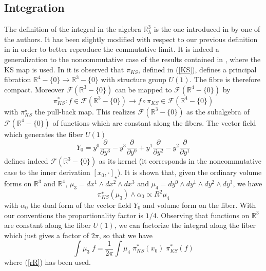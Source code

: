 \documentclass[a4paper,11pt]{article}
\numberwithin{equation}{section}
\newcommand{\be}{\begin{equation}}
\newcommand{\ee}{\end{equation}}
\newcommand{\eqn}[1]{(\ref{#1})}
\newcommand\gR{{\mathbb R}}
\def\gR{{\mathbb R}}
\newcommand\del{{\partial}}
\theoremstyle{nonumberplain}
\begin{document}
  \subsection{Integration}
 The definition of the integral in the algebra $\gR^3_\lambda$ is the one introduced in \cite{V14} by one of the authors. It has been slightly modified with respect to our previous definition in \cite{vit-wal-12}  in order to better reproduce the commutative limit.  It is indeed a  generalization to the noncommutative case of the results contained in  \cite{DMV05}, where the  KS map is used. 
In \cite{DMV05}  it is   observed  that $\pi_{KS}$, defined in \eqn{KS}, defines a principal fibration $\gR^4-\{0\}\rightarrow \gR^3-\{0\}$ with structure group $U(1)$. The fibre is therefore compact. Moreover $\mathcal{F}(\gR^3-\{0\})$ can be mapped to  $\mathcal{F}(\gR^4-\{0\})$ by
 \be
\pi^*_{KS}: f \in \mathcal{F}(\gR^3-\{0\})\rightarrow f\circ \pi_{KS}\in \mathcal{F}(\gR^4-\{0\})
\ee
with  $\pi_{KS}^\star$ the pull-back map.
This realizes $\mathcal{F}(\gR^3-\{0\})$ as the subalgebra of $\mathcal{F}(\gR^4-\{0\})$ of functions which are constant along the fibers.
The vector field which generates the fiber $U(1)$
\be
Y_0= y^0 \frac{\del}{ \del y^3} - y^3 \frac{\del}{ \del y^0 } +y^1 \frac{\del}{ \del y^2} -y^2 \frac{\del}{ \del y^1} \label{fibergen}
\ee
defines indeed $\mathcal{F}(\gR^3-\{0\})$ as its kernel (it corresponds in the noncommutative case to the inner derivation $[x_0, \cdot]_\star$).
It is shown that, given the ordinary volume forms on $\gR^3$ and $\gR^4$, $\mu_3= dx^1\wedge dx^2\wedge dx^3$ and $\mu_4= dy^0\wedge dy^1\wedge dy^2\wedge dy^3 $, we have
\be
\pi^\star_{KS} (\mu_3 ) \wedge \alpha_0\propto  R^2 \mu_4
\ee
with $\alpha_0$ the dual form of the vector field $Y_0$ and volume form on the fiber. With our conventions the proportionality factor is $1/4$.
Observing that functions on $\gR^3$ are constant along the fiber $U(1)$, we can factorize the integral along the fiber which just gives a factor of $2\pi$, so that
 we have
 \be
\int \mu_3 \;f =\frac{1}{2\pi}\int \mu_4\; \pi^*_{KS}(x_0) \;  \pi^*_{KS}(f) \label{intdef}
\ee
where \eqn{rR} has been used.
\end{document}
